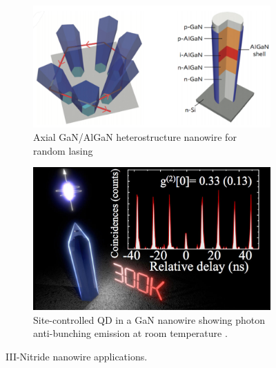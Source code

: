 \begin{figure}

	\begin{subfigure}[b]{0.49\textwidth}
		\centering
		\includegraphics[width=.95\linewidth]{Figs/Ch1/Nwlaser.png}
		\caption{Axial GaN/AlGaN heterostructure nanowire for random lasing\cite{Li2015}}
		
	\end{subfigure}%
	\hspace*{0.5cm}
	\begin{subfigure}[b]{0.49\textwidth}
		\centering
		\includegraphics[width=.85\linewidth]{Figs/Ch1/holmes.png}
		\caption{Site-controlled QD in a GaN nanowire showing photon anti-bunching emission at room temperature \cite{Holmes2014}.}
	\end{subfigure}%
	
	\caption{III-Nitride nanowire applications.}
	\label{1.19}
\end{figure}

\FloatBarrier

